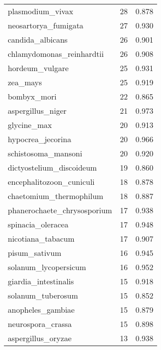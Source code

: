 \begin{tabular}{lrr}
               plasmodium\_vivax &                  28 &     0.878 \\
           neosartorya\_fumigata &                  27 &     0.930 \\
               candida\_albicans &                  26 &     0.901 \\
      chlamydomonas\_reinhardtii &                  26 &     0.908 \\
                hordeum\_vulgare &                  25 &     0.931 \\
                       zea\_mays &                  25 &     0.919 \\
                    bombyx\_mori &                  22 &     0.865 \\
              aspergillus\_niger &                  21 &     0.973 \\
                    glycine\_max &                  20 &     0.913 \\
              hypocrea\_jecorina &                  20 &     0.966 \\
            schistosoma\_mansoni &                  20 &     0.920 \\
       dictyostelium\_discoideum &                  19 &     0.860 \\
       encephalitozoon\_cuniculi &                  18 &     0.878 \\
        chaetomium\_thermophilum &                  18 &     0.887 \\
    phanerochaete\_chrysosporium &                  17 &     0.938 \\
              spinacia\_oleracea &                  17 &     0.948 \\
              nicotiana\_tabacum &                  17 &     0.907 \\
                  pisum\_sativum &                  16 &     0.945 \\
           solanum\_lycopersicum &                  16 &     0.952 \\
           giardia\_intestinalis &                  15 &     0.918 \\
              solanum\_tuberosum &                  15 &     0.852 \\
              anopheles\_gambiae &                  15 &     0.879 \\
              neurospora\_crassa &                  15 &     0.898 \\
             aspergillus\_oryzae &                  13 &     0.938 \\

\end{tabular}
